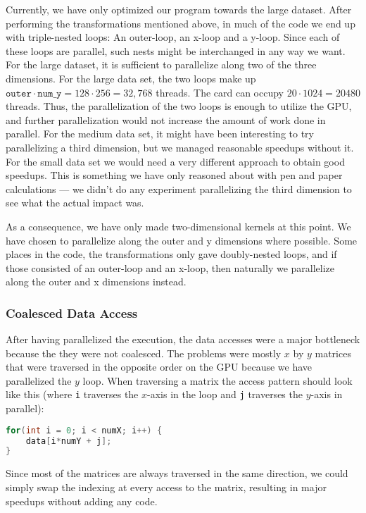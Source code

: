 \documentclass[11pt]{article}
\begin{document}
Currently, we have only optimized our program towards the large dataset.
After performing the transformations mentioned above, in much of the code we end up with triple-nested loops: An outer-loop, an x-loop and a y-loop. Since each of these loops are parallel, such nests might be interchanged in any way we want. For the large dataset, it is sufficient to parallelize along two of the three dimensions.
For the large data set, the two loops make up $\mathtt{outer} \cdot \mathtt{num\_y} = 128 \cdot 256 = 32,768$ threads.
The card can occupy $20 \cdot 1024 = 20480$ threads.
Thus, the parallelization of the two loops is enough to utilize the GPU, and further parallelization would not increase the amount of work done in parallel.
For the medium data set, it might have been interesting to try parallelizing a third dimension, but we managed reasonable speedups without it.
For the small data set we would need a very different approach to obtain good speedups.
This is something we have only reasoned about with pen and paper calculations --- we didn't do any experiment parallelizing the third dimension to see what the actual impact was.

As a consequence, we have only made two-dimensional kernels at this point. We have chosen to parallelize along the outer and y dimensions where possible. Some places in the code, the transformations only gave doubly-nested loops, and if those consisted of an outer-loop and an x-loop, then naturally we parallelize along the outer and x dimensions instead.

\subsubsection{Coalesced Data Access}
After having parallelized the execution, the data accesses were a major bottleneck because the they were not coalesced.
The problems were mostly $x$ by $y$ matrices that were traversed in the opposite order on the GPU because we have parallelized the $y$ loop.
When traversing a matrix the access pattern should look like this (where \texttt{i} traverses the $x$-axis in the loop and \texttt{j} traverses the $y$-axis in parallel):
\begin{lstlisting}[language=C]
for(int i = 0; i < numX; i++) {
	data[i*numY + j];
}
\end{lstlisting}

Since most of the matrices are always traversed in the same direction, we could simply swap the indexing at every access to the matrix, resulting in major speedups without adding any code.
\end{document}
